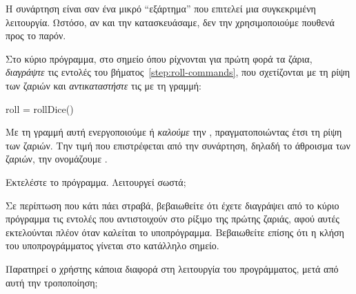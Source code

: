 \documentclass[a4paper,11pt,oneside]{book}
\begin{document}
\begin{step}
Η συνάρτηση  είναι σαν ένα μικρό ``εξάρτημα'' που επιτελεί μια συγκεκριμένη λειτουργία. Ωστόσο, αν και την κατασκευάσαμε, δεν την χρησιμοποιούμε πουθενά προς το παρόν.

Στο κύριο πρόγραμμα, στο σημείο όπου ρίχνονται για πρώτη φορά τα ζάρια, \emph{διαγράψτε} τις εντολές του βήματος~\ref{step:roll-commands}, που σχετίζονται με τη ρίψη των ζαριών και \emph{αντικαταστήστε} τις με τη γραμμή:

\begin{pynew}
roll = rollDice()
\end{pynew}

Με τη γραμμή αυτή ενεργοποιούμε ή \emph{καλούμε} την , πραγματοποιώντας έτσι τη ρίψη των ζαριών. Την τιμή που επιστρέφεται από την συνάρτηση, δηλαδή το άθροισμα των ζαριών, την ονομάζουμε .

Εκτελέστε το πρόγραμμα. Λειτουργεί σωστά;

\marginnote[14pt]{\icondiscuss}
\dottedline

\marginnote[8pt]{\iconcaution}
Σε περίπτωση που κάτι πάει στραβά, βεβαιωθείτε ότι έχετε διαγράψει από το κύριο πρόγραμμα τις εντολές που αντιστοιχούν στο ρίξιμο της πρώτης ζαριάς, αφού αυτές εκτελούνται πλέον όταν καλείται το υποπρόγραμμα. Βεβαιωθείτε επίσης ότι η κλήση του υποπρογράμματος γίνεται στο κατάλληλο σημείο.

Παρατηρεί ο χρήστης κάποια διαφορά στη λειτουργία του προγράμματος, μετά από αυτή την τροποποίηση;

\marginnote[14pt]{\icondiscuss}
\dottedline
\end{step}
\end{document}
